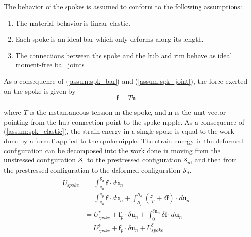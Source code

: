 \documentclass[\rootdir/thesis.tex]{subfiles}
\begin{document}

The behavior of the spokes is assumed to conform to the following assumptions:

\begin{enumerate}
    \item{The material behavior is linear-elastic.}\label{assum:spk_elastic}
    \item{Each spoke is an ideal bar which only deforms along its length.}\label{assum:spk_bar}
    \item{The connections between the spoke and the hub and rim behave as ideal moment-free ball joints.}\label{assum:spk_joint}
\end{enumerate}

As a consequence of (\ref{assum:spk_bar}) and (\ref{assum:spk_joint}), the force exerted on the spoke is given by
\begin{equation}
\label{eq:spk_force}
\mathbf{f} = T\mathbf{n}
\end{equation}

where $T$ is the instantaneous tension in the spoke, and $\mathbf{n}$ is the unit vector pointing from the hub connection point to the spoke nipple. As a consequence of (\ref{assum:spk_elastic}), the strain energy in a single spoke is equal to the work done by a force $\mathbf{f}$ applied to the spoke nipple. The strain energy in the deformed configuration can be decomposed into the work done in moving from the unstressed configuration $\mathcal{S}_0$ to the prestressed configuration $\mathcal{S}_p$, and then from the prestressed configuration to the deformed configuration $\mathcal{S}_d$.
\begin{align}
\begin{split}
\label{eq:U_spoke}
U_{spoke} &= \int_{\mathcal{S}_0}^{\mathcal{S}_d} \mathbf{f} \cdot d\mathbf{u}_n\\
          &= \int_{\mathcal{S}_0}^{\mathcal{S}_p} \mathbf{f} \cdot d\mathbf{u}_n +
             \int_{\mathcal{S}_p}^{\mathcal{S}_d} (\mathbf{f}_p + \delta\mathbf{f}) \cdot d\mathbf{u}_n\\
          &= U_{spoke}^p + \mathbf{f}_p \cdot \delta\mathbf{u}_n +
             \int_{0}^{\delta\mathbf{u}_n} \delta\mathbf{f} \cdot d\mathbf{u}_n\\
          &= U_{spoke}^p + \mathbf{f}_p \cdot \delta\mathbf{u}_n + U_{spoke}^{\delta}
\end{split}
\end{align}
\end{document}
